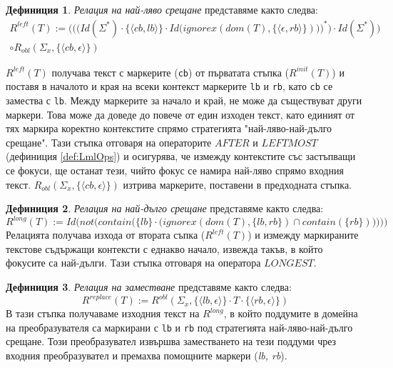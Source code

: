\documentclass[12pt, oneside]{article}
\theoremstyle{definition}
\newtheorem{definition}{Дефиниция}[section]
\begin{document}
\begin{definition}\label{def:Rleft} \emph{Релация на най-ляво срещане} представяме както следва:
	\begin{equation}
		\begin{split}
			R^{left}(T) :=
			\bigg( \bigg( \Big( Id(\Sigma^*) \cdot \{ \langle cb, lb \rangle \} \cdot Id \big(ignorex(dom(T), \{ \langle \epsilon, rb \rangle \})\big) \Big)^* \bigg) \cdot Id(\Sigma^*) \bigg) \\ 
			\circ R_{obl} (\Sigma_x, \{ \langle cb, \epsilon \rangle \}) 
		\end{split}
	\end{equation}

	\(R^{left}(T)\) получава текст с маркерите (\verb/cb/) от първатата стъпка (\(R^{init}(T)\)) и поставя в началото и края на всеки контекст маркерите \verb/lb/ и \verb/rb/, като  \verb/cb/ се замества с \verb/lb/. Между маркерите за начало и край, не може да съществуват други маркери. Това може да доведе до повече от един изходен текст, като единият от тях маркира коректно контекстите спрямо стратегията "най-ляво-най-дълго срещане". Тази стъпка отговаря на операторите \(AFTER \text{ и } LEFTMOST\) (дефиниция \ref{def:LmlOps}) и осигурява, че измежду контекстите със застъпващи се фокуси, ще останат тези, чийто фокус се намира най-ляво спрямо входния текст. \( R_{obl} (\Sigma_x, \{ \langle cb, \epsilon \rangle \}) \) изтрива маркерите, поставени в предходната стъпка.
\end{definition}

\begin{definition}\label{def:Rlong} \emph{Релация на най-дълго срещане} представяме както следва:
	\[ R^{long}(T) := Id \bigg( not \Big(contain \big(\{lb\} \cdot \big(ignorex(dom(T), \{lb, rb\}) \cap contain(\{rb\})\big) \big) \Big) \bigg) \]
	Релацията получава изхода от втората съпка (\(R^{left}(T)\)) и измежду маркираните текстове съдържащи контексти с еднакво начало, извежда такъв, в който фокусите са най-дълги. Тази стъпка отговаря на оператора \(LONGEST\).
\end{definition}

\begin{definition}\label{def:Rreplace} \emph{Релация на заместване} представяме както следва:
	\[ R^{replace}(T) := R^{obl}(\Sigma_x, \{ \langle lb, \epsilon \rangle \} \cdot T \cdot \{ \langle rb, \epsilon \rangle \}) \]
	В тази стъпка получаваме изходния текст на \(R^{long}\), в който поддумите в домейна на преобразувателя са маркирани с \verb/lb/ и \verb/rb/ под стратегията най-ляво-най-дълго срещане. Този преобразувател извършва заместването на тези поддуми чрез входния преобразувател и премахва помощните маркери (\emph{lb, rb}).
\end{definition}
\end{document}
